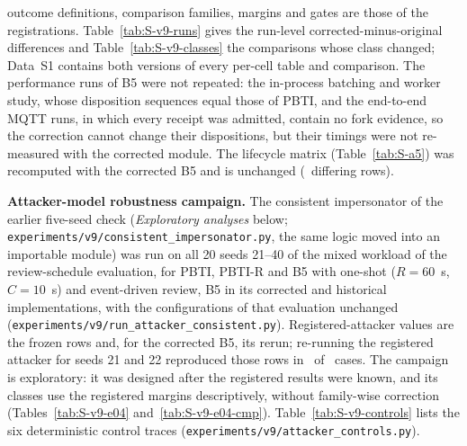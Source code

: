\documentclass[10pt,a4paper]{article}
\newcommand{\sys}{PBTI}
\begin{document}
outcome definitions, comparison families, margins and gates are those of the registrations. Table~\ref{tab:S-v9-runs} gives the run-level corrected-minus-original differences and Table~\ref{tab:S-v9-classes} the comparisons whose class changed; Data~S1 contains both versions of every per-cell table and comparison. The performance runs of B5 were not repeated: the in-process batching and worker study, whose disposition sequences equal those of \sys, and the end-to-end MQTT runs, in which every receipt was admitted, contain no fork evidence, so the correction cannot change their dispositions, but their timings were not re-measured with the corrected module. The lifecycle matrix (Table~\ref{tab:S-a5}) was recomputed with the corrected B5 and is unchanged (\YAfiveCorrectedDiffs\ differing rows).

\begin{table}[!htbp]
\caption{Corrected minus historical B5 and B5s, run by run on the same specifications and seeds. Changed: runs in which O1, O2, NLX, $W$ or AV5 differs; the other columns give the range of the differences over all runs of the stage (NLX, $W$ and AV5 only where the tracer ran). Counters (holds, distinct held and recovered observations) are not outcomes and are not counted here.\label{tab:S-v9-runs}}
\footnotesize\centering

\end{table}

\begin{table}[!htbp]
\caption{Registered comparisons whose class differs between the historical and the corrected comparator (\YCmpClassChanged\ of \YCmpN\ comparisons of the review-schedule evaluation, the selective-hold grid and the factorial cells; \YCmpEstChanged\ estimates changed at all). Mean paired difference (arm $-$ reference) with 95\% bootstrap interval.\label{tab:S-v9-classes}}
\footnotesize\centering

\end{table}

\noindent\textbf{Attacker-model robustness campaign.} The consistent impersonator of the earlier five-seed check (\emph{Exploratory analyses} below; \texttt{experiments/\allowbreak{}v9/\allowbreak{}consistent\_\allowbreak{}impersonator.py}, the same logic moved into an importable module) was run on all 20 seeds 21--40 of the mixed workload of the review-schedule evaluation, for \sys, PBTI-R and B5 with one-shot ($R=60$~s, $C=10$~s) and event-driven review, B5 in its corrected and historical implementations, with the configurations of that evaluation unchanged (\texttt{experiments/\allowbreak{}v9/\allowbreak{}run\_\allowbreak{}attacker\_\allowbreak{}consistent.py}). Registered-attacker values are the frozen rows and, for the corrected B5, its rerun; re-running the registered attacker for seeds 21 and 22 reproduced those rows in \YEfourReproOk\ of \YEfourReproN\ cases. The campaign is exploratory: it was designed after the registered results were known, and its classes use the registered margins descriptively, without family-wise correction (Tables~\ref{tab:S-v9-e04} and~\ref{tab:S-v9-e04-cmp}). Table~\ref{tab:S-v9-controls} lists the six deterministic control traces (\texttt{experiments/\allowbreak{}v9/\allowbreak{}attacker\_\allowbreak{}controls.py}).
\end{document}

